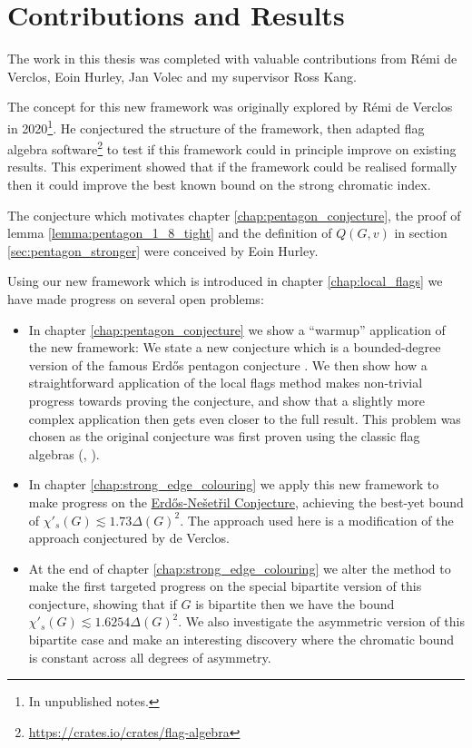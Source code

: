 \section*{Contributions and Results}

The work in this thesis was completed with valuable contributions from Rémi de Verclos,
Eoin Hurley, Jan Volec and my supervisor Ross Kang.

The concept for this new framework was originally explored by Rémi de Verclos in
2020\footnote{In unpublished notes.}.
He conjectured the structure of the framework, then adapted flag algebra
software\footnote{\url{https://crates.io/crates/flag-algebra}}
to test if this framework could in principle improve on existing results.
This experiment showed that if the framework could be realised formally then it could improve the
best known bound on the strong chromatic index.

The conjecture which motivates chapter \ref{chap:pentagon_conjecture}, the
proof of lemma \ref{lemma:pentagon_1_8_tight} and the definition of $Q(G,v)$ in
section \ref{sec:pentagon_stronger} were conceived by Eoin Hurley.

\hfill

Using our new framework which is introduced in chapter \ref{chap:local_flags}
we have made progress on several open problems:
\begin{itemize}
    \item In chapter \ref{chap:pentagon_conjecture} we show a ``warmup'' application of the new
        framework: We state a new conjecture which is a bounded-degree version of the famous
        Erd\H{o}s pentagon conjecture \cite{erdos_pentagon_1984}.
        We then show how a straightforward application of the local flags method makes non-trivial
        progress towards proving the conjecture, and show that a slightly more complex application
        then gets even closer to the full result.
        This problem was chosen as the original conjecture was first proven using
        the classic flag algebras (\cite{hatamiNumberPentagonsTrianglefree2013},
        \cite{grzesikMaximumNumberFivecycles2012}).
    \item In chapter \ref{chap:strong_edge_colouring} we apply this new framework to make progress on the
        \hyperref[conj:intro_erdos_nesetril]{Erd\H{o}s-Nešetřil Conjecture}, achieving the best-yet
        bound of $\chi'_s(G) \lesssim 1.73\Delta(G)^2$. The approach used here is a modification
        of the approach conjectured by de Verclos.
    \item At the end of chapter \ref{chap:strong_edge_colouring} we alter the method to make
        the first targeted progress on the special bipartite version of this conjecture, showing that
        if $G$ is bipartite then we have the bound $\chi'_s(G) \lesssim 1.6254\Delta(G)^2$. We also
        investigate the asymmetric version of this bipartite case and make an interesting discovery
        where the chromatic bound is constant across all degrees of asymmetry.
\end{itemize}

